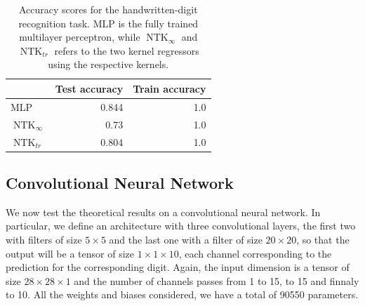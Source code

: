 \documentclass[11pt,notitlepage]{article}
\numberwithin{equation}{section}
\DeclareMathOperator{\NTK}{NTK}
\theoremstyle{remark}
\theoremstyle{definition}
\begin{document}
	\begin{table}[th!]
		\centering
		\begin{tabular}{l|r|r}
			 & Test accuracy & Train accuracy\\
			 \hline
			 MLP & 0.844 & 1.0 \\
			 $\NTK_\infty$ & 0.73 & 1.0 \\
			 $\NTK_{tr}$ & 0.804 & 1.0
		\end{tabular}
	\caption{Accuracy scores for the handwritten-digit recognition task. MLP is the fully trained multilayer perceptron, while $\NTK_\infty$ and $\NTK_{tr}$ refers to the two kernel regressors using the respective kernels.}
	\label{tab:ntkScores}
	\end{table}
	
	\subsection{Convolutional Neural Network}

	We now test the theoretical results on a convolutional neural network.
	In particular, we define an architecture with three convolutional layers, the first two with filters of size $5\times 5$ and the last one with a filter of size $20 \times 20$, so that the output will be a tensor of size $1 \times 1 \times 10$, each channel corresponding to the prediction for the corresponding digit.
	Again, the input dimension is a tensor of size $28 \times 28 \times 1$ and the number of channels passes from 1 to 15, to 15 and finnaly to 10.
	All the weights and biases considered, we have a total of 90550 parameters.
	
\end{document}
